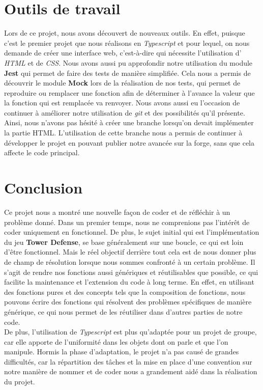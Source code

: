 \documentclass{article}
\begin{document}
\vspace{1cm}
\section{Outils de travail}
Lors de ce projet, nous avons découvert de nouveaux outils. En effet, puisque c'est le premier projet que nous réalisons en \textit{Typescript} et pour lequel, on nous demande de créer une interface web, c'est-à-dire qui nécessite l'utilisation d' \textit{HTML} et de \textit{CSS}. Nous avons aussi pu approfondir notre utilisation du module \textbf{Jest} qui permet de faire des tests de manière simplifiée. Cela nous a permis de découvrir le module \textbf{Mock} lors de la réalisation de nos tests, qui permet de reproduire ou remplacer une fonction afin de déterminer à l'avance la valeur que la fonction qui est remplacée va renvoyer. Nous avons aussi eu l'occasion de continuer à améliorer notre utilisation de \textit{git} et des possibilités qu'il présente. Ainsi, nous n'avons pas hésité à créer une branche lorsqu'on devait implémenter la partie HTML. L'utilisation de cette branche nous a permis de continuer à développer le projet en pouvant publier notre avancée sur la forge, sans que cela affecte le code principal.
\vspace{1cm}

\section*{Conclusion}
    Ce projet nous a montré une nouvelle façon de coder et de réfléchir à un problème donné. Dans un premier temps, nous ne comprenions pas l'intérêt de coder uniquement en fonctionnel. De plus, le sujet initial qui est l'implémentation du jeu \textbf{Tower Defense}, se base généralement sur une boucle, ce qui est loin d'être fonctionnel. Mais le réel objectif derrière tout cela est de nous donner plus de champ de résolution lorsque nous sommes confronté à un certain problème. Il s'agit de rendre nos fonctions aussi génériques et réutilisables que possible, ce qui facilite la maintenance et l'extension du code à long terme. En effet, en utilisant des fonctions pures et des concepts tels que la composition de fonctions, nous pouvons écrire des fonctions qui résolvent des problèmes spécifiques de manière générique, ce qui nous permet de les réutiliser dans d'autres parties de notre code.\\
    De plus, l'utilisation de \textit{Typescript} est plus qu'adaptée pour un projet de groupe, car elle apporte de l'uniformité dans les objets dont on parle et que l'on manipule. Hormis la phase d'adaptation, le projet n'a pas causé de grandes difficultés, car la répartition des tâches et la mise en place d'une convention sur notre manière de nommer et de coder nous a grandement aidé dans la réalisation du projet.
\end{document}
